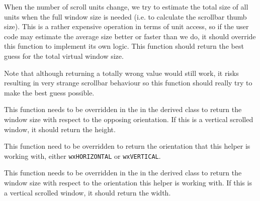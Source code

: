 
When the number of scroll units change, we try to estimate the total size of
all units when the full window size is needed (i.e. to calculate the scrollbar
thumb size). This is a rather expensive operation in terms of unit access, so
if the user code may estimate the average size better or faster than we do, it
should override this function to implement its own logic. This function should
return the best guess for the total virtual window size.

Note that although returning a totally wrong value would still work, it risks
resulting in very strange scrollbar behaviour so this function should really
try to make the best guess possible.


\label{wxvarscrollhelperbasegetnonorientationtargetsize}


This function needs to be overridden in the in the derived class to return the
window size with respect to the opposing orientation. If this is a vertical
scrolled window, it should return the height.




\label{wxvarscrollhelperbasegetorientation}


This function need to be overridden to return the orientation that this helper
is working with, either {\tt wxHORIZONTAL} or {\tt wxVERTICAL}.


\label{wxvarscrollhelperbasegetorientationtargetsize}


This function needs to be overridden in the in the derived class to return the
window size with respect to the orientation this helper is working with. If
this is a vertical scrolled window, it should return the width.




